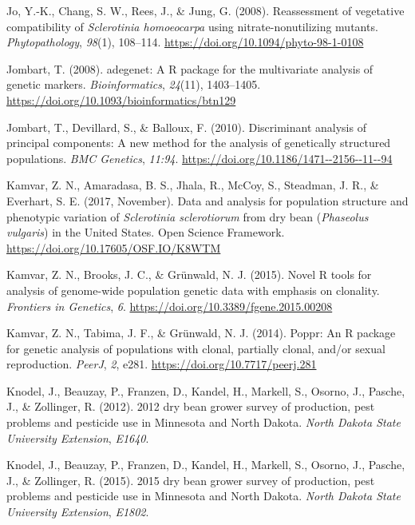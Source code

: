 \hypertarget{ref-jo2008reassessment}{}
Jo, Y.-K., Chang, S. W., Rees, J., \& Jung, G. (2008). Reassessment of
vegetative compatibility of \emph{Sclerotinia homoeocarpa} using
nitrate-nonutilizing mutants. \emph{Phytopathology}, \emph{98}(1),
108--114. \url{https://doi.org/10.1094/phyto-98-1-0108}

\hypertarget{ref-jombart2008adegenet}{}
Jombart, T. (2008). adegenet: A R package for the multivariate analysis
of genetic markers. \emph{Bioinformatics}, \emph{24}(11), 1403--1405.
\url{https://doi.org/10.1093/bioinformatics/btn129}

\hypertarget{ref-jombart2010discriminant}{}
Jombart, T., Devillard, S., \& Balloux, F. (2010). Discriminant analysis
of principal components: A new method for the analysis of genetically
structured populations. \emph{BMC Genetics}, \emph{11:94}.
\url{https://doi.org/10.1186/1471--2156--11--94}

\hypertarget{ref-kamvar2017data}{}
Kamvar, Z. N., Amaradasa, B. S., Jhala, R., McCoy, S., Steadman, J. R.,
\& Everhart, S. E. (2017, November). Data and analysis for population
structure and phenotypic variation of \emph{Sclerotinia sclerotiorum}
from dry bean (\emph{Phaseolus vulgaris}) in the United States. Open
Science Framework. \url{https://doi.org/10.17605/OSF.IO/K8WTM}

\hypertarget{ref-kamvar2015novel}{}
Kamvar, Z. N., Brooks, J. C., \& Grünwald, N. J. (2015). Novel R tools
for analysis of genome-wide population genetic data with emphasis on
clonality. \emph{Frontiers in Genetics}, \emph{6}.
\url{https://doi.org/10.3389/fgene.2015.00208}

\hypertarget{ref-kamvar2014poppr}{}
Kamvar, Z. N., Tabima, J. F., \& Grünwald, N. J. (2014). Poppr: An R
package for genetic analysis of populations with clonal, partially
clonal, and/or sexual reproduction. \emph{PeerJ}, \emph{2}, e281.
\url{https://doi.org/10.7717/peerj.281}

\hypertarget{ref-knodel2012dry}{}
Knodel, J., Beauzay, P., Franzen, D., Kandel, H., Markell, S., Osorno,
J., Pasche, J., \& Zollinger, R. (2012). 2012 dry bean grower survey of
production, pest problems and pesticide use in Minnesota and North
Dakota. \emph{North Dakota State University Extension}, \emph{E1640}.

\hypertarget{ref-knodel2015dry}{}
Knodel, J., Beauzay, P., Franzen, D., Kandel, H., Markell, S., Osorno,
J., Pasche, J., \& Zollinger, R. (2015). 2015 dry bean grower survey of
production, pest problems and pesticide use in Minnesota and North
Dakota. \emph{North Dakota State University Extension}, \emph{E1802}.

